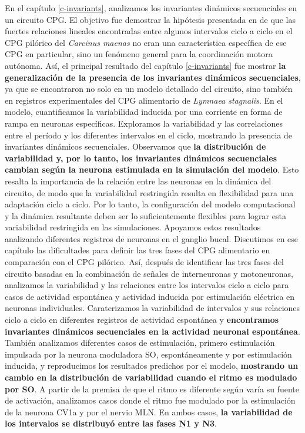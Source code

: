 En el capítulo \ref{c-invariants}, analizamos los invariantes dinámicos secuenciales en un circuito CPG. El objetivo fue demostrar la hipótesis presentada en \cite{elices_robust_2019} de que las fuertes relaciones lineales encontradas entre algunos intervalos ciclo a ciclo en el CPG pilórico del \textit{Carcinus maenas} no eran una característica específica de ese CPG en particular, sino un fenómeno general para la coordinación motora autónoma. Así, el principal resultado del capítulo \ref{c-invariants} fue mostrar \textbf{la generalización de la presencia de los invariantes dinámicos secuenciales}, ya que se encontraron no solo en un modelo detallado del circuito, sino también en registros experimentales del CPG alimentario de \textit{Lymnaea stagnalis}. En el modelo, cuantificamos la variabilidad inducida por una corriente en forma de rampa en neuronas específicas. Exploramos la variabilidad y las correlaciones entre el período y los diferentes intervalos en el ciclo, mostrando la presencia de invariantes dinámicos secuenciales. Observamos que \textbf{la distribución de variabilidad y, por lo tanto, los invariantes dinámicos secuenciales cambian según la neurona estimulada en la simulación del modelo}. Esto resalta la importancia de la relación entre las neuronas en la dinámica del circuito, de modo que la variabilidad restringida resulta en flexibilidad para una adaptación ciclo a ciclo. Por lo tanto, la configuración del modelo computacional y la dinámica resultante deben ser lo suficientemente flexibles para lograr esta variabilidad restringida en las simulaciones. Apoyamos estos resultados analizando diferentes registros de neuronas en el ganglio bucal. Discutimos en ese capítulo las dificultades para definir las tres fases del CPG alimentario en comparación con el CPG pilórico. Así, después de identificar las tres fases del circuito basadas en la combinación de señales de interneuronas y motoneuronas, analizamos la variabilidad y las relaciones entre los intervalos ciclo a ciclo para casos de actividad espontánea y actividad inducida por estimulación eléctrica en neuronas individuales. Caraterizamos la variabilidad de intervalos y sus relaciones ciclo a ciclo en diferentes registros de actividad espontánea y \textbf{encontramos invariantes dinámicos secuenciales en la actividad neuronal espontánea}. También analizamos diferentes casos de estimulación, primero estimulación impulsada por la neurona moduladora SO, espontáneamente y por estimulación inducida, y reproducimos los resultados predichos por el modelo, \textbf{mostrando un cambio en la distribución de variabilidad cuando el ritmo es modulado por SO}. A partir de la premisa de que el ritmo es diferente según varía su fuente de activación, analizamos casos donde el ritmo fue modulado por la estimulación de la neurona CV1a y por el nervio MLN. En ambos casos, \textbf{la variabilidad de los intervalos se distribuyó entre las fases N1 y N3}.

